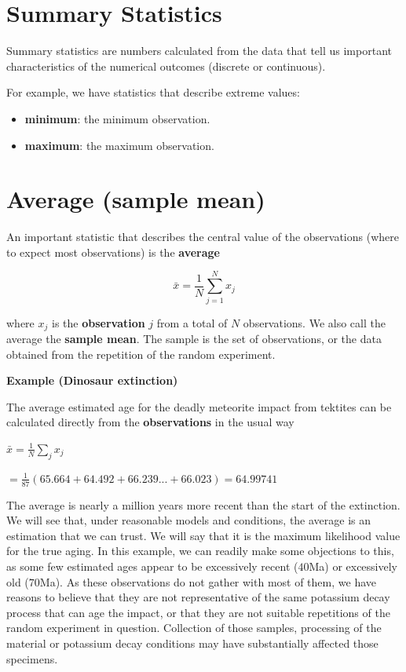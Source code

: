 \documentclass[
]{book}
\providecommand{\tightlist}{%
  \setlength{\itemsep}{0pt}\setlength{\parskip}{0pt}}
\begin{document}
\hypertarget{summary-statistics}{%
\section{Summary Statistics}\label{summary-statistics}}

Summary statistics are numbers calculated from the data that tell us important characteristics of the numerical outcomes (discrete or continuous).

For example, we have statistics that describe extreme values:

\begin{itemize}
\tightlist
\item
  \textbf{minimum}: the minimum observation.
\item
  \textbf{maximum}: the maximum observation.
\end{itemize}

\hypertarget{average-sample-mean}{%
\section{Average (sample mean)}\label{average-sample-mean}}

An important statistic that describes the central value of the observations (where to expect most observations) is the \textbf{average}

\[\bar{x}=\frac{1}{N} \sum_{j=1}^N x_j\]

where \(x_j\) is the \textbf{observation} \(j\) from a total of \(N\) observations. We also call the average the \textbf{sample mean}. The sample is the set of observations, or the data obtained from the repetition of the random experiment.

\textbf{Example (Dinosaur extinction)}

The average estimated age for the deadly meteorite impact from tektites can be calculated directly from the \textbf{observations} in the usual way

\(\bar{x}= \frac{1}{ N}\sum_j x_j\)

\(= \frac{1}{87}(65.664 + 64.492 + 66.239... + 66.023) = 64.99741\)

The average is nearly a million years more recent than the start of the extinction. We will see that, under reasonable models and conditions, the average is an estimation that we can trust. We will say that it is the maximum likelihood value for the true aging. In this example, we can readily make some objections to this, as some few estimated ages appear to be excessively recent (\(40\)Ma) or excessively old (\(70\)Ma). As these observations do not gather with most of them, we have reasons to believe that they are not representative of the same potassium decay process that can age the impact, or that they are not suitable repetitions of the random experiment in question. Collection of those samples, processing of the material or potassium decay conditions may have substantially affected those specimens.
\end{document}
